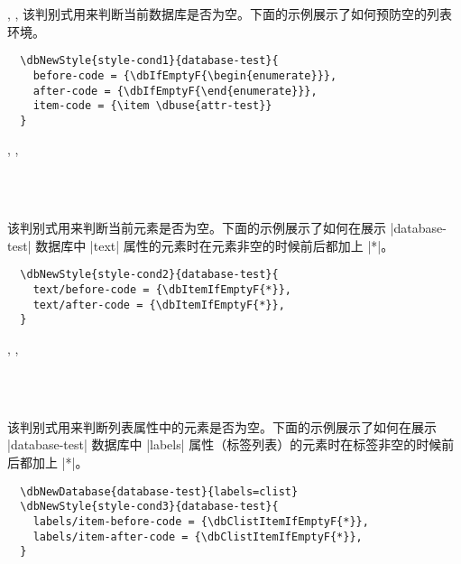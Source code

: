 \documentclass[full]{l3doc}
\begin{document}
\begin{documentation}
\begin{function}{\dbIfEmptyT, \dbIfEmptyF, \dbIfEmptyTF}
  该判别式用来判断当前数据库是否为空。下面的示例展示了如何预防空的列表环境。
\end{function}

\begin{verbatim}
  \dbNewStyle{style-cond1}{database-test}{
    before-code = {\dbIfEmptyF{\begin{enumerate}}},
    after-code = {\dbIfEmptyF{\end{enumerate}}},
    item-code = {\item \dbuse{attr-test}}
  }
\end{verbatim}

\begin{function}{\dbItemIfEmptyT, \dbItemIfEmptyF, \dbItemIfEmptyTF}
  \begin{syntax}
       \\
      \\
     
  \end{syntax}

  该判别式用来判断当前元素是否为空。下面的示例展示了如何在展示 |database-test|
  数据库中 |text| 属性的元素时在元素非空的时候前后都加上 |*|。
\end{function}

\begin{verbatim}
  \dbNewStyle{style-cond2}{database-test}{
    text/before-code = {\dbItemIfEmptyF{*}},
    text/after-code = {\dbItemIfEmptyF{*}},
  }
\end{verbatim}

\begin{function}{\dbClistItemIfEmptyT, \dbClistItemIfEmptyF, \dbClistItemIfEmptyTF}
  \begin{syntax}
       \\
      \\
     
  \end{syntax}

  该判别式用来判断列表属性中的元素是否为空。下面的示例展示了如何在展示
  |database-test| 数据库中 |labels| 属性（标签列表）的元素时在标签非空的时候前
  后都加上 |*|。
\end{function}

\begin{verbatim}
  \dbNewDatabase{database-test}{labels=clist}
  \dbNewStyle{style-cond3}{database-test}{
    labels/item-before-code = {\dbClistItemIfEmptyF{*}},
    labels/item-after-code = {\dbClistItemIfEmptyF{*}},
  }
\end{verbatim}


\end{documentation}
\end{document}
